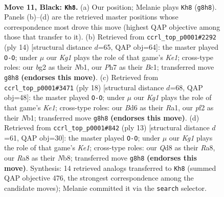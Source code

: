 \documentclass[11pt]{article}
\begin{document}
\clearpage

\begin{figure}[p]\centering
\begin{subfigure}{0.46\textwidth}\centering
\resizebox{\linewidth}{!}{%
\newchessgame
\chessboard[
  setfen={rnbqr1k1/p5pp/2pb1n2/1p1p1p2/3P4/4BNP1/PPQ1PPBP/RN3RK1 b - - 3 11},
  showmover=false,
  pgfstyle=straightmove, color=movearrow, markmove={g8-h8}
]}
\caption{}
\end{subfigure}\hfill
\begin{subfigure}{0.46\textwidth}\centering
\resizebox{\linewidth}{!}{%
\newchessgame
\chessboard[
  setfen={rnb1kb1r/ppq2ppp/4pn2/3p4/3P4/1PPB1N2/P4PPP/RNBQK2R w KQkq - 1 8},
  showmover=false,
  pgfstyle=straightmove, color=movearrow, markmove={e1-g1}
]}
\caption{}
\end{subfigure}
\\[4pt]
\begin{subfigure}{0.46\textwidth}\centering
\resizebox{\linewidth}{!}{%
\newchessgame
\chessboard[
  setfen={1nbqkb1r/1p3ppp/r3pn2/p7/1pPP4/P4NP1/5PBP/RNBQK2R w KQk - 2 10},
  showmover=false,
  pgfstyle=straightmove, color=movearrow, markmove={e1-g1}
]}
\caption{}
\end{subfigure}\hfill
\begin{subfigure}{0.46\textwidth}\centering
\resizebox{\linewidth}{!}{%
\newchessgame
\chessboard[
  setfen={rnbqk2r/pp2bppp/2p2n2/3p4/2PQ4/5NP1/PP2PPBP/RNB2RK1 b kq - 3 7},
  showmover=false,
  pgfstyle=straightmove, color=movearrow, markmove={e8-g8}
]}
\caption{}
\end{subfigure}
\caption{\textbf{Move 11, Black: \texttt{Kh8}.} (a) Our position; Melanie plays \texttt{Kh8} (\texttt{g8h8}). Panels (b)--(d) are the retrieved master positions whose correspondence most drove this move (highest QAP objective among those that transfer to it). (b) Retrieved from \texttt{ccrl\_top\_p0001\#2292} (ply 14) [structural distance $d$=65, QAP obj=64]: the master played \texttt{O-O}; under $\mu$ our \emph{Kg1} plays the role of that game's \emph{Ke1}; cross-type roles: our \emph{b}g2 as their \emph{N}b1, our \emph{P}h7 as their \emph{B}c1; transferred move \texttt{g8h8} \textbf{(endorses this move)}. (c) Retrieved from \texttt{ccrl\_top\_p0001\#3471} (ply 18) [structural distance $d$=68, QAP obj=48]: the master played \texttt{O-O}; under $\mu$ our \emph{Kg1} plays the role of that game's \emph{Ke1}; cross-type roles: our \emph{B}d6 as their \emph{R}a1, our \emph{p}f2 as their \emph{N}b1; transferred move \texttt{g8h8} \textbf{(endorses this move)}. (d) Retrieved from \texttt{ccrl\_top\_p0001\#842} (ply 13) [structural distance $d$=61, QAP obj=30]: the master played \texttt{O-O}; under $\mu$ our \emph{Kg1} plays the role of that game's \emph{Ke1}; cross-type roles: our \emph{Q}d8 as their \emph{R}a8, our \emph{R}a8 as their \emph{N}b8; transferred move \texttt{g8h8} \textbf{(endorses this move)}. Synthesis: 14 retrieved analogs transferred to \texttt{Kh8} (summed QAP objective 476, the strongest correspondence among the candidate moves); Melanie committed it via the \texttt{search} selector.}
\label{fig:thought-m21}
\end{figure}
\end{document}
